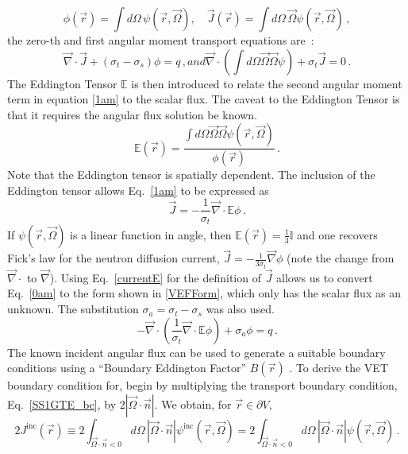 \documentclass[12pt]{report}
\newcommand{\vr}{\vec{r}}
\newcommand{\vO}{\vec{\Omega}}
\renewcommand{\div}{\vec{\nabla} \cdot}
\newcommand{\grad}{\vec{\nabla}}
\newcommand{\bound}{\partial V}
\newcommand{\vn}{\vec{n}}
\newcommand{\Edd}{\mathbb{E}}
\newcommand{\BEdd}{B}
\newcommand{\sigt}{\sigma_t}
\newcommand{\sigs}{\sigma_s}
\newcommand{\siga}{\sigma_a}
\newcommand{\scalSource}{q}
\begin{document}
\begin{equation}
\label{VETFormStart}
\phi(\vr)=\int d\Omega \, \psi( \vr,\vO )
,\quad
\vec{J}(\vr)= \int d\Omega \, \vO \psi( \vr,\vO ) \,,
\end{equation}
the zero-th and first angular moment transport equations are~: 
%
\begin{subequations}
%
\begin{equation}
\label{0am}
\div \vec{J} + (\sigt-\sigs) \phi = \scalSource \,,
\end{equation}
and
\begin{equation}
\label{1am}
\div \left(  \int d\Omega \vO \vO \psi \right) + \sigt \vec{J} = 0 \,.
\end{equation}
%
\end{subequations}
The Eddington Tensor $\Edd$ is then introduced to relate the second angular moment term in equation \eqref{1am} to the scalar flux. The caveat to the Eddington Tensor is that it requires the angular flux solution be known.
\begin{equation}
\label{EddDef}
\Edd(\vr)=\frac{\int d\Omega \vO \vO \psi(\vr,\vO)}{\phi(\vr)} \,.
\end{equation}Note that the Eddington tensor is spatially dependent.
The inclusion of the Eddington tensor allows Eq.~\eqref{1am} to be expressed as 
\begin{equation}
\label{currentE}
\vec{J} = - \frac{1}{\sigt} \div \Edd \phi \,.
\end{equation}
If $\psi(\vr,\vO)$ is a linear function in angle, then $\Edd(\vr)=\tfrac{1}{3}\mathbb{I}$ and one recovers Fick's law for the neutron diffusion current, $\vec{J} = - \frac{1}{3\sigt} \grad \phi$ (note the change from $\div$ to $\grad$). Using Eq.~\eqref{currentE} for the definition of $\vec{J}$ allows us to convert Eq.~\eqref{0am} to the form shown in \eqref{VEFForm}, which only has the scalar flux as an unknown. The substitution $\siga = \sigt-\sigs$ was also used.
\begin{equation}
\label{VEFForm}
- \div \left( \frac{1}{\sigt}\div \Edd \phi \right) + \siga \phi = \scalSource \,.
\end{equation}
The known incident angular flux can be used to generate a suitable boundary conditions using a 
``Boundary Eddington Factor'' $\BEdd(\vr)$ \cite{Miften}. To derive the VET boundary condition for, begin by multiplying the transport boundary condition,
Eq.~\eqref{SS1GTE_bc}, by $2 | \vO \cdot \vn |$. We obtain, for $\vr \in \bound$,
\begin{equation}
2 J^{\text{inc}}(\vr) \equiv  2 \int_{\vO \cdot \vn <0 }  d \Omega\, | \vO \cdot \vec{n} | \psi^{\text{inc}}(\vr,\vO) 
= 2\int_{\vO \cdot \vn <0 } d \Omega\,  | \vO \cdot \vn |  \psi(\vr,\vO) \,.
\end{equation}
\end{document}
